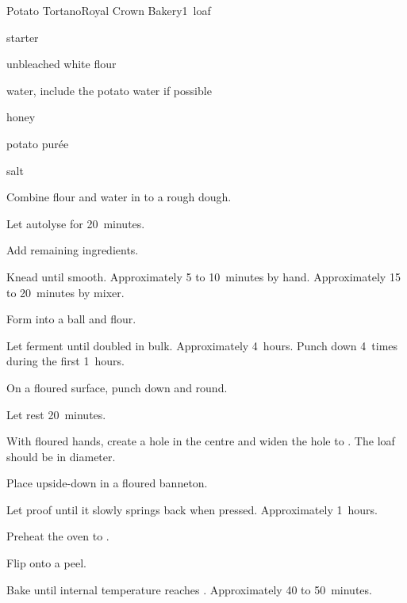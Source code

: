 \begin{recipe}{Potato Tortano}{Royal Crown Bakery}{1~loaf}

\begin{ingredients}
\item {} starter
\item {} unbleached white flour
\item {} water, include the potato water if possible
\item {} honey
\item {} potato pur\'ee
\item {} salt
\end{ingredients}

\begin{directions}
\item Combine flour and water in to a rough dough.
\item Let autolyse for 20~minutes.
\item Add remaining ingredients.
\item Knead until smooth. Approximately 5 to 10~minutes by hand. Approximately 15 to 20~minutes by mixer.
\item Form into a ball and flour.
\item Let ferment until doubled in bulk. Approximately 4~hours. Punch down 4~times during the first 1\half{}~hours.
\item On a floured surface, punch down and round.
\item Let rest 20~minutes.
\item With floured hands, create a hole in the centre and widen the hole to . The loaf should be  in diameter.
\item Place upside-down in a floured banneton.
\item Let proof until it slowly springs back when pressed. Approximately 1\half{}~hours.
\item Preheat the oven to .
\item Flip onto a peel.
\item Bake until internal temperature reaches . Approximately 40 to 50~minutes.
\end{directions}

\end{recipe}
